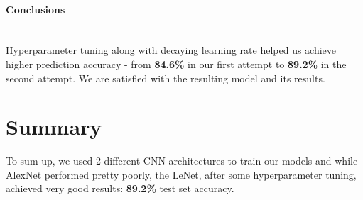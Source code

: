 \documentclass[12pt]{article}
\begin{document}
        \paragraph{Conclusions} \mbox{} \\
        Hyperparameter tuning along with decaying learning rate helped
        us achieve higher prediction accuracy - from \textbf{84.6\%} in our first attempt
        to \textbf{89.2\%} in the second attempt. We are satisfied with the resulting model
        and its results.
    \section{Summary}
      To sum up, we used 2 different CNN architectures to train our models and
      while AlexNet performed pretty poorly, the LeNet, after some hyperparameter
      tuning, achieved very good results: \textbf{89.2\%} test set accuracy.
\end{document}
